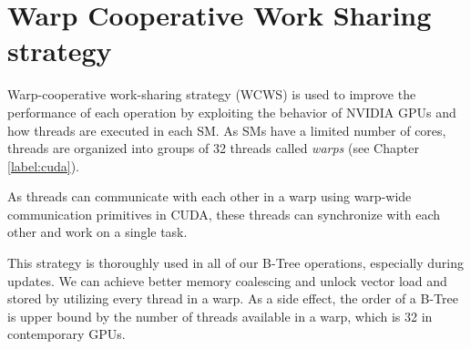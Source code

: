 \section{Warp Cooperative Work Sharing strategy}

Warp-cooperative work-sharing strategy (WCWS) is used to improve the performance of each operation by exploiting the behavior of NVIDIA GPUs and how threads are executed in each SM. As SMs have a limited number of cores, threads are organized into groups of 32 threads called \textit{warps} (see Chapter \ref{label:cuda}).

As threads can communicate with each other in a warp using warp-wide communication primitives in CUDA, these threads can synchronize with each other and work on a single task.

This strategy is thoroughly used in all of our B-Tree operations, especially during updates. We can achieve better memory coalescing and unlock vector load and stored by utilizing every thread in a warp. As a side effect, the order of a B-Tree is upper bound by the number of threads available in a warp, which is 32 in contemporary GPUs.
